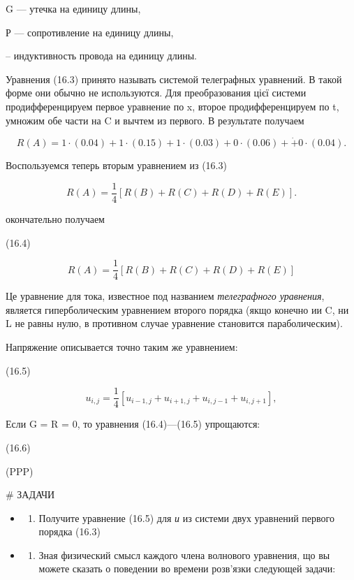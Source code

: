 \documentclass[
  ukrainian,
]{article}
\providecommand{\tightlist}{%
  \setlength{\itemsep}{0pt}\setlength{\parskip}{0pt}}
\begin{document}
G --- утечка на единицу длины,

Р --- сопротивление на единицу длины,

-- индуктивность провода на единицу длины.

Уравнения (16.3) принято называть системой телеграфных уравнений. В
такой форме они обычно не используются. Для преобразования цієї системи
продифференцируем первое уравнение по x, второе продифференцируем по t,
умножим обе части на C и вычтем из первого. В результате получаем

\[
R(A) = 1 \cdot (0.04) + 1 \cdot (0.15) + 1 \cdot (0.03) + 0 \cdot (0.06) + \dot + 0 \cdot (0.04).
\]

Воспользуемся теперь вторым уравнением из (16.3)

\[
R(A) = \frac{1}{4} [R(B) + R(C) + R(D) + R(E)].
\]

окончательно получаем

(16.4)

\[
R(A) = \frac{1}{4} [R(B) + R(C) + R(D) + R(E)]
\]

Це уравнение для тока, известное под названием \emph{телеграфного
уравнения}, является гиперболическим уравнением второго порядка (якщо
конечно ии C, ни L не равны нулю, в противном случае уравнение
становится параболическим).

Напряжение описывается точно таким же уравнением:

(16.5)

\[
u_{i,j} = \frac{1}{4} \left[ u_{i-1,j} + u_{i+1,j} + u_{i,j-1} + u_{i,j+1} \right],
\]

Если G = R = 0, то уравнения (16.4)---(16.5) упрощаются:

(16.6)

(PPP)

\# ЗАДАЧИ

\begin{itemize}
\tightlist
\item
  \begin{enumerate}
  \def\labelenumi{\arabic{enumi}.}
  \tightlist
  \item
    Получите уравнение (16.5) для \emph{и} из системи двух уравнений
    первого порядка (16.3)
  \end{enumerate}
\item
  \begin{enumerate}
  \def\labelenumi{\arabic{enumi}.}
  \setcounter{enumi}{1}
  \tightlist
  \item
    Зная физический смысл каждого члена волнового уравнения, що вы
    можете сказать о поведении во времени розв'язки следующей задачи:
  \end{enumerate}
\end{itemize}
\end{document}
